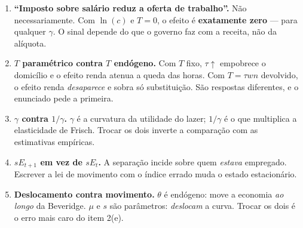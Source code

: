 \documentclass[11pt, a4paper]{article}
\begin{document}
\begin{tcolorbox}[trapbox, title={As cinco confusões que mais custam nota nesta lista}]
\small
\begin{enumerate}[label=\arabic*.]
\item \textbf{``Imposto sobre salário reduz a oferta de trabalho''.} Não necessariamente.
Com $\ln(c)$ e $T=0$, o efeito é \textbf{exatamente zero} --- para qualquer $\gamma$. O
sinal depende do que o governo faz com a receita, não da alíquota.
\item \textbf{$T$ paramétrico contra $T$ endógeno.} Com $T$ fixo, $\tau\uparrow$ empobrece
o domicílio e o efeito renda atenua a queda das horas. Com $T=\tau w n$ devolvido, o efeito
renda \emph{desaparece} e sobra só substituição. São respostas diferentes, e o enunciado
pede a primeira.
\item \textbf{$\gamma$ contra $1/\gamma$.} $\gamma$ é a curvatura da utilidade do lazer;
$1/\gamma$ é o que multiplica a elasticidade de Frisch. Trocar os dois inverte a
comparação com as estimativas empíricas.
\item \textbf{$s E_{t+1}$ em vez de $s E_t$.} A separação incide sobre quem \emph{estava}
empregado. Escrever a lei de movimento com o índice errado muda o estado estacionário.
\item \textbf{Deslocamento contra movimento.} $\theta$ é endógeno: move a economia
\emph{ao longo} da Beveridge. $\mu$ e $s$ são parâmetros: \emph{deslocam} a curva. Trocar
os dois é o erro mais caro do item 2(e).
\end{enumerate}
\end{tcolorbox}
\end{document}

